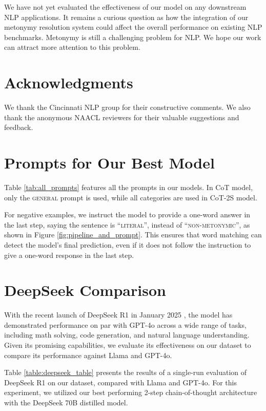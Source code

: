 \documentclass[11pt]{article}
\begin{document}
We have not yet evaluated the effectiveness of our model on any downstream NLP applications. It remains a curious question as how the integration of our metonymy resolution system could affect the overall performance on existing NLP benchmarks. Metonymy is still a challenging problem for NLP. We hope our work can attract more attention to this problem.

\section*{Acknowledgments}
We thank the Cincinnati NLP group for their constructive comments. We also thank the anonymous NAACL
reviewers for their valuable suggestions and feedback.




\clearpage
\newpage  %
\appendix

\section{Prompts for Our Best Model}

Table \ref{tab:all_prompts} features all the prompts in our models. In CoT model, only the \textsc{general} prompt is used, while all categories are used in CoT-2S model.

For negative examples, we instruct the model to provide a one-word answer in the last step, saying the sentence is ``\textsc{literal}'', instead of ``\textsc{non-metonymic}'', as shown in Figure \ref{fig:pipeline_and_prompt}. This ensures that word matching can detect the model's final prediction, even if it does not follow the instruction to give a one-word response in the last step.


\section{DeepSeek Comparison}

With the recent launch of DeepSeek R1 in January 2025 \cite{deepseekai2025}, the model has demonstrated performance on par with GPT-4o across a wide range of tasks, including math solving, code generation, and natural language understanding. Given its promising capabilities, we evaluate its effectiveness on our dataset to compare its performance against Llama and GPT-4o.

Table \ref{table:deepseek_table} presents the results of a single-run evaluation of DeepSeek R1 on our dataset, compared with Llama and GPT-4o. For this experiment, we utilized our best performing 2-step chain-of-thought architecture with the DeepSeek 70B distilled model.
\end{document}
